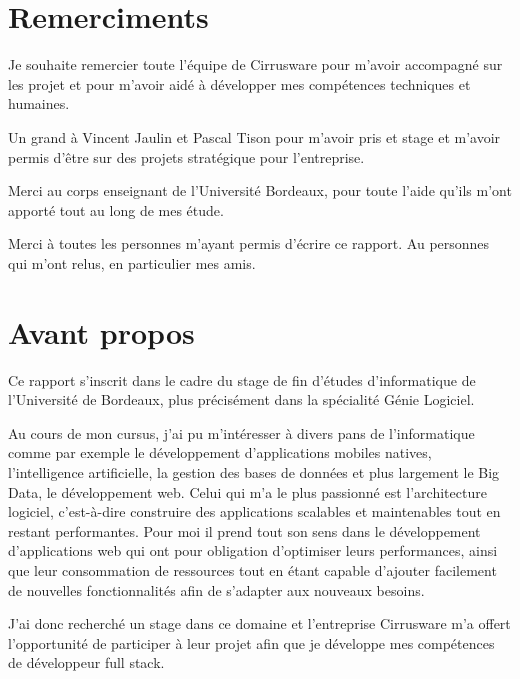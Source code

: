 \section{Remerciments}
Je souhaite remercier toute l'équipe de Cirrusware pour m'avoir accompagné sur les projet et pour m'avoir aidé à développer mes compétences techniques et humaines.

Un grand à Vincent Jaulin et Pascal Tison pour m'avoir pris et stage et m'avoir permis d'être sur des projets stratégique pour l'entreprise.

Merci au corps enseignant de l'Université Bordeaux, pour toute l'aide qu'ils m'ont apporté tout au long de mes étude.

Merci à toutes les personnes m'ayant permis d'écrire ce rapport. Au personnes qui m'ont relus, en particulier mes amis. 





\newpage
\section{Avant propos}
Ce rapport s'inscrit dans le cadre du stage de fin d'études d'informatique de l'Université de Bordeaux, plus précisément dans la spécialité Génie Logiciel.

Au cours de mon cursus, j'ai pu m'intéresser à divers pans de l'informatique comme par exemple le développement d'applications mobiles natives, l'intelligence artificielle, la gestion des bases de données et plus largement le Big Data, le développement web. Celui qui m'a le plus passionné est l'architecture logiciel, c'est-à-dire construire des applications scalables et maintenables tout en restant performantes. Pour moi il prend tout son sens dans le développement d'applications web qui ont pour obligation d'optimiser leurs performances, ainsi que leur consommation de ressources tout en étant capable d'ajouter facilement de nouvelles fonctionnalités afin de s'adapter aux nouveaux besoins.

J'ai donc recherché un stage dans ce domaine et l'entreprise Cirrusware m'a offert l'opportunité de participer à leur projet afin que je développe mes compétences de développeur full stack. 





